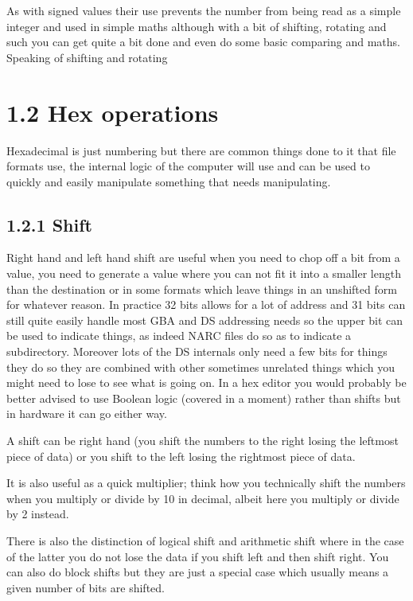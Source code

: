 \documentclass[
]{book}
\begin{document}
As with signed values their use prevents the number from being read as a simple integer and used in simple maths although with a bit of shifting, rotating and such you can get quite a bit done and even do some basic comparing and maths. Speaking of shifting and rotating

\hypertarget{hex-operations}{%
\section{1.2 Hex operations}\label{hex-operations}}

Hexadecimal is just numbering but there are common things done to it that file formats use, the internal logic of the computer will use and can be used to quickly and easily manipulate something that needs manipulating.

\hypertarget{shift}{%
\subsection{1.2.1 Shift}\label{shift}}

Right hand and left hand shift are useful when you need to chop off a bit from a value, you need to generate a value where you can not fit it into a smaller length than the destination or in some formats which leave things in an unshifted form for whatever reason. In practice 32 bits allows for a lot of address and 31 bits can still quite easily handle most GBA and DS addressing needs so the upper bit can be used to indicate things, as indeed NARC files do so as to indicate a subdirectory. Moreover lots of the DS internals only need a few bits for things they do so they are combined with other sometimes unrelated things which you might need to lose to see what is going on. In a hex editor you would probably be better advised to use Boolean logic (covered in a moment) rather than shifts but in hardware it can go either way.

A shift can be right hand (you shift the numbers to the right losing the leftmost piece of data) or you shift to the left losing the rightmost piece of data.

It is also useful as a quick multiplier; think how you technically shift the numbers when you multiply or divide by 10 in decimal, albeit here you multiply or divide by 2 instead.

There is also the distinction of logical shift and arithmetic shift where in the case of the latter you do not lose the data if you shift left and then shift right. You can also do block shifts but they are just a special case which usually means a given number of bits are shifted.
\end{document}
